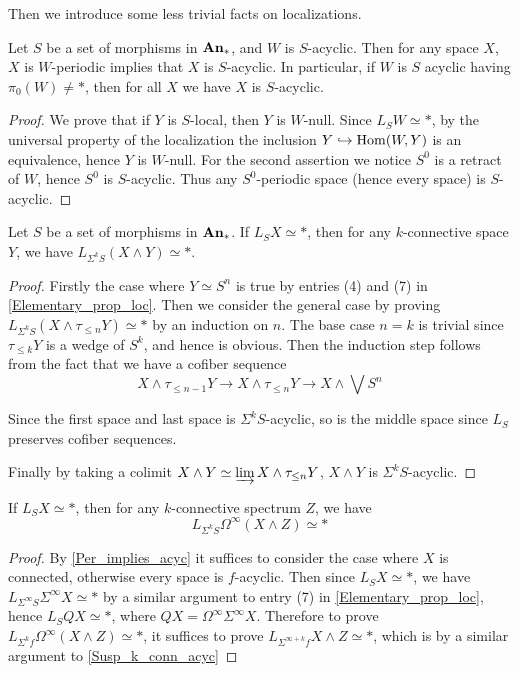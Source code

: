 	Then we introduce some less trivial facts on localizations. 

	\begin{lemma}\label{Per_implies_acyc}
		Let $S$ be a set of morphisms in $\mathbf{An}_*$, and $W$ is $S$-acyclic. Then for any space $X$, $X$ is $W$-periodic implies that $X$ is $S$-acyclic. In particular, if $W$ is $S$ acyclic having $\pi_0(W)\neq*$, then for all $X$ we have $X$ is $S$-acyclic. 
	\end{lemma}
	\begin{proof}
		We prove that if $Y$ is $S$-local, then $Y$ is $W$-null. Since $L_SW\simeq*$, by the universal property of the localization the inclusion $Y\hookrightarrow\operatorname{\mathrm{Hom}}(W,Y)$ is an equivalence, hence $Y$ is $W$-null. For the second assertion we notice $S^0$ is a retract of $W$, hence $S^0$ is $S$-acyclic. Thus any $S^0$-periodic space (hence every space) is $S$-acyclic. 
	\end{proof}
	
	\begin{lemma}\label{Susp_k_conn_acyc}
		Let $S$ be a set of morphisms in $\mathbf{An}_*$. If $L_SX\simeq*$, then for any $k$-connective space $Y$, we have $L_{\Sigma^kS}(X\wedge Y)\simeq*$. 
	\end{lemma}
	\begin{proof}
		Firstly the case where $Y\simeq S^n$ is true by entries (4) and (7) in \cref{Elementary_prop_loc}. Then we consider the general case by proving $L_{\Sigma^kS}(X\wedge \tau_{\leq n}Y)\simeq*$ by an induction on $n$. The base case $n=k$ is trivial since $\tau_{\leq k}Y$ is a wedge of $S^k$, and hence is obvious. Then the induction step follows from the fact that we have a cofiber sequence 
		\[ X\wedge\tau_{\leq n-1}Y\to X\wedge\tau_{\leq n}Y\to X\wedge\bigvee S^n \]

		Since the first space and last space is $\Sigma^kS$-acyclic, so is the middle space since $L_S$ preserves cofiber sequences. 

		Finally by taking a colimit $X\wedge Y\simeq\varinjlim X\wedge\tau_{\leq n}Y$, $X\wedge Y$ is $\Sigma^kS$-acyclic. 
	\end{proof}

	\begin{coro}\label{Susp_k_conn_acyc_sp}
		If $L_SX\simeq*$, then for any $k$-connective spectrum $Z$, we have 
		\[ L_{\Sigma^kS}\Omega^\infty(X\wedge Z)\simeq* \]
	\end{coro}
	\begin{proof}
		By \cref{Per_implies_acyc} it suffices to consider the case where $X$ is connected, otherwise every space is $f$-acyclic. Then since $L_SX\simeq *$, we have $L_{\Sigma^\infty S}\Sigma^\infty X\simeq*$ by a similar argument to entry (7) in \cref{Elementary_prop_loc}, hence $L_SQX\simeq *$, where $QX=\Omega^\infty\Sigma^\infty X$. Therefore to prove $L_{\Sigma^kf}\Omega^\infty(X\wedge Z)\simeq*$, it suffices to prove $L_{\Sigma^{\infty+k}f}X\wedge Z\simeq*$, which is by a similar argument to \cref{Susp_k_conn_acyc} 
	\end{proof}

